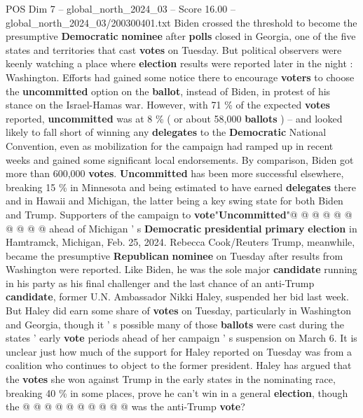 \begin{textsample}{POS Dim 7 – global\_north\_2024\_03 – Score 16.00 – global\_north\_2024\_03/200300401.txt}  \label{ex:f7_pos_031}
Biden crossed the threshold to become the presumptive \textbf{Democratic} \textbf{nominee} after \textbf{polls} closed in Georgia, one of the five states and territories that cast \textbf{votes} on Tuesday.
But political observers were keenly watching a place where \textbf{election} results were reported later in the night : Washington.
Efforts had gained some notice there to encourage \textbf{voters} to choose the \textbf{uncommitted} option on the \textbf{ballot}, instead of Biden, in protest of his stance on the Israel-Hamas war.
However, with 71 \% of the expected \textbf{votes} reported, \textbf{uncommitted} was at 8 \% ( or about 58,000 \textbf{ballots} ) -- and looked likely to fall short of winning any \textbf{delegates} to the \textbf{Democratic} National Convention, even as mobilization for the campaign had ramped up in recent weeks and gained some significant local endorsements.
By comparison, Biden got more than 600,000 \textbf{votes}. \textbf{Uncommitted} has been more successful elsewhere, breaking 15 \% in Minnesota and being estimated to have earned \textbf{delegates} there and in Hawaii and Michigan, the latter being a key swing state for both Biden and Trump.
Supporters of the campaign to \textbf{vote}"\textbf{Uncommitted}"@ @ @ @ @ @ @ @ @ @ ahead of Michigan ' s \textbf{Democratic} \textbf{presidential} \textbf{primary} \textbf{election} in Hamtramck, Michigan, Feb. 25, 2024.
Rebecca Cook/Reuters Trump, meanwhile, became the presumptive \textbf{Republican} \textbf{nominee} on Tuesday after results from Washington were reported.
Like Biden, he was the sole major \textbf{candidate} running in his party as his final challenger and the last chance of an anti-Trump \textbf{candidate}, former U.N.
Ambassador Nikki Haley, suspended her bid last week.
But Haley did earn some share of \textbf{votes} on Tuesday, particularly in Washington and Georgia, though it ' s possible many of those \textbf{ballots} were cast during the states ' early \textbf{vote} periods ahead of her campaign ' s suspension on March 6.
It is unclear just how much of the support for Haley reported on Tuesday was from a coalition who continues to object to the former president.
Haley has argued that the \textbf{votes} she won against Trump in the early states in the nominating race, breaking 40 \% in some places, prove he can't win in a general \textbf{election}, though the @ @ @ @ @ @ @ @ @ @ was the anti-Trump \textbf{vote}?

\end{textsample}
